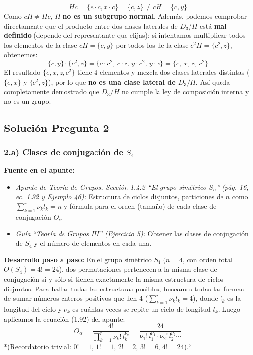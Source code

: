 \documentclass[11pt, a4paper]{article}
\begin{document}
\begin{enumerate}
\begin{itemize}
        \[
        Hc = \{e \cdot c, x \cdot c\} = \{c, z\} \neq cH = \{c, y\}
        \]
        Como $cH \neq Hc$, $H$ \textbf{no es un subgrupo normal}.
        Además, podemos comprobar directamente que el producto entre dos clases laterales de $D_3/H$ está \textbf{mal definido} (depende del representante que elijas): si intentamos multiplicar todos los elementos de la clase $cH = \{c, y\}$ por todos los de la clase $c^2H = \{c^2, z\}$, obtenemos:
        \[
        \{c, y\} \cdot \{c^2, z\} = \{c \cdot c^2, \, c \cdot z, \, y \cdot c^2, \, y \cdot z\} = \{e, \, x, \, z, \, c^2\}
        \]
        El resultado $\{e, x, z, c^2\}$ tiene 4 elementos y mezcla dos clases laterales distintas ($\{e, x\}$ y $\{c^2, z\}$), por lo que \textbf{no es una clase lateral de $D_3/H$}. Así queda completamente demostrado que $D_3/H$ no cumple la ley de composición interna y no es un grupo.
    \end{itemize}
\end{enumerate}

\newpage

\subsection*{Solución Pregunta 2}

\subsubsection*{2.a) Clases de conjugación de $S_4$}
\textbf{Fuente en el apunte:}
\begin{itemize}
    \item \textit{Apunte de Teoría de Grupos, Sección 1.4.2 ``El grupo simétrico $S_n$'' (pág. 16, ec. 1.92 y Ejemplo 46):} Estructura de ciclos disjuntos, particiones de $n$ como $\sum_{k=1}^r \nu_k l_k = n$ y fórmula para el orden (tamaño) de cada clase de conjugación $O_\alpha$.
    \item \textit{Guía ``Teoría de Grupos III'' (Ejercicio 5):} Obtener las clases de conjugación de $S_4$ y el número de elementos en cada una.
\end{itemize}

\textbf{Desarrollo paso a paso:}
En el grupo simétrico $S_4$ ($n = 4$, con orden total $O(S_4) = 4! = 24$), dos permutaciones pertenecen a la misma clase de conjugación si y sólo si tienen exactamente la misma estructura de ciclos disjuntos. Para hallar todas las estructuras posibles, buscamos todas las formas de sumar números enteros positivos que den $4$ ($\sum_{k=1}^r \nu_k l_k = 4$), donde $l_k$ es la longitud del ciclo y $\nu_k$ es cuántas veces se repite un ciclo de longitud $l_k$. Luego aplicamos la ecuación (1.92) del apunte:
\[
O_\alpha = \frac{4!}{\prod_{k=1}^r \nu_k! \, l_k^{\nu_k}} = \frac{24}{\nu_1! \, l_1^{\nu_1} \cdot \nu_2! \, l_2^{\nu_2} \cdots}
\]
*(Recordatorio trivial: $0! = 1$, $1! = 1$, $2! = 2$, $3! = 6$, $4! = 24$).*
\end{document}
